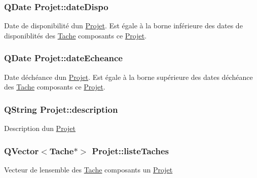 \subsubsection[{date\+Dispo}]{\setlength{\rightskip}{0pt plus 5cm}Q\+Date Projet\+::date\+Dispo\hspace{0.3cm}{\ttfamily [private]}}\label{class_projet_a8a89803d629bb571062921008e6a2639}
Date de disponibilité d\textquotesingle{}un \hyperlink{class_projet}{Projet}. Est égale à la borne inférieure des dates de disponiblités des \hyperlink{class_tache}{Tache} composants ce \hyperlink{class_projet}{Projet}. \hypertarget{class_projet_a868ee370bb8f071b830dda61f55d99cd}{}
\subsubsection[{date\+Echeance}]{\setlength{\rightskip}{0pt plus 5cm}Q\+Date Projet\+::date\+Echeance\hspace{0.3cm}{\ttfamily [private]}}\label{class_projet_a868ee370bb8f071b830dda61f55d99cd}
Date d\textquotesingle{}échéance d\textquotesingle{}un \hyperlink{class_projet}{Projet}. Est égale à la borne supérieure des dates d\textquotesingle{}échéance des \hyperlink{class_tache}{Tache} composants ce \hyperlink{class_projet}{Projet}. \hypertarget{class_projet_ac2e3a37d5f0201390991b97f258ce0eb}{}
\subsubsection[{description}]{\setlength{\rightskip}{0pt plus 5cm}Q\+String Projet\+::description\hspace{0.3cm}{\ttfamily [private]}}\label{class_projet_ac2e3a37d5f0201390991b97f258ce0eb}
Description d\textquotesingle{}un \hyperlink{class_projet}{Projet} \hypertarget{class_projet_a268bc6fc9be6d5e266439cc6371cd617}{}
\subsubsection[{liste\+Taches}]{\setlength{\rightskip}{0pt plus 5cm}Q\+Vector$<${\bf Tache}$\ast$$>$ Projet\+::liste\+Taches\hspace{0.3cm}{\ttfamily [private]}}\label{class_projet_a268bc6fc9be6d5e266439cc6371cd617}
Vecteur de l\textquotesingle{}ensemble des \hyperlink{class_tache}{Tache} composants un \hyperlink{class_projet}{Projet} \hypertarget{class_projet_a9759849c856c2ac63f94751b876fd289}{}
